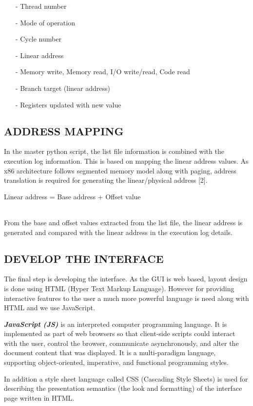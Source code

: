 \begin{itemize}
 \item[-] Thread number
 \item[-]  Mode of operation
 \item[-]  Cycle number
 \item[-]  Linear address
 \item[-]  Memory write, Memory read, I/O write/read, Code read
 \item[-]  Branch target (linear address)
 \item[-]  Registers updated with new value
\end{itemize}


\subsection {ADDRESS MAPPING}

In the master python script, the list file information is combined with the execution log information. This is based on mapping the linear address values. As x86 architecture follows segmented memory model along with paging, address translation is required for generating the linear/physical address [2].
\\
\centerline{Linear address = Base address + Offset value}
\\
From the base and offset values extracted from the list file, the linear address is generated and compared with the linear address in the execution log details.


\subsection {DEVELOP THE INTERFACE}

The final step is developing the interface. As the GUI is web based, layout design is done using HTML (Hyper Text Markup Language). However for providing interactive features to the user a much more powerful language is need along with HTML and we use JavaScript.

\emph {\bf JavaScript (JS)} is an interpreted computer programming language. It is  implemented as part of web browsers so that client-side scripts could interact with the user, control the browser, communicate asynchronously, and alter the document content that was displayed. It is a multi-paradigm language, supporting object-oriented, imperative, and functional programming styles.

In addition a style sheet language called CSS (Cascading Style Sheets) is used for describing the presentation semantics (the look and formatting) of the interface page written in HTML.


